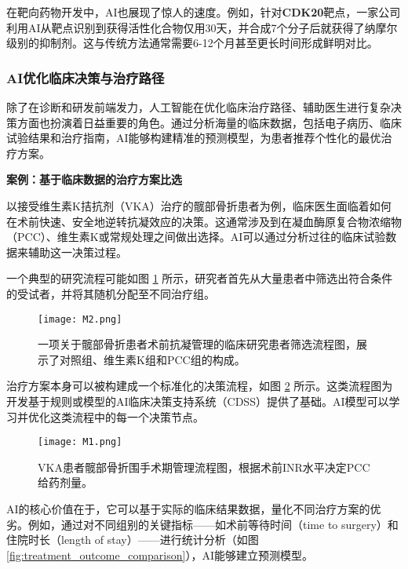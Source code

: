 \begin{itemize}
\begin{enumerate}
        在靶向药物开发中，AI也展现了惊人的速度。例如，针对\textbf{CDK20}靶点，一家公司利用AI从靶点识别到获得活性化合物仅用30天，并合成7个分子后就获得了纳摩尔级别的抑制剂。这与传统方法通常需要6-12个月甚至更长时间形成鲜明对比。
    \end{enumerate}

    \subsubsection{AI优化临床决策与治疗路径}
    除了在诊断和研发前端发力，人工智能在优化临床治疗路径、辅助医生进行复杂决策方面也扮演着日益重要的角色。通过分析海量的临床数据，包括电子病历、临床试验结果和治疗指南，AI能够构建精准的预测模型，为患者推荐个性化的最优治疗方案。

    \textbf{案例：基于临床数据的治疗方案比选}

    以接受维生素K拮抗剂（VKA）治疗的髋部骨折患者为例，临床医生面临着如何在术前快速、安全地逆转抗凝效应的决策。这通常涉及到在凝血酶原复合物浓缩物（PCC）、维生素K或常规处理之间做出选择。AI可以通过分析过往的临床试验数据来辅助这一决策过程。

    一个典型的研究流程可能如图 \ref{fig:clinical_trial_patient_selection} 所示，研究者首先从大量患者中筛选出符合条件的受试者，并将其随机分配至不同治疗组。

    \begin{figure}[htbp]
        \centering
        \texttt{[image: M2.png]}
        \caption{一项关于髋部骨折患者术前抗凝管理的临床研究患者筛选流程图，展示了对照组、维生素K组和PCC组的构成。}
        \label{fig:clinical_trial_patient_selection}
    \end{figure}

    治疗方案本身可以被构建成一个标准化的决策流程，如图 \ref{fig:hip_fracture_treatment_protocol} 所示。这类流程图为开发基于规则或模型的AI临床决策支持系统（CDSS）提供了基础。AI模型可以学习并优化这类流程中的每一个决策节点。

    \begin{figure}[htbp]
        \centering
        \texttt{[image: M1.png]}
        \caption{VKA患者髋部骨折围手术期管理流程图，根据术前INR水平决定PCC给药剂量。}
        \label{fig:hip_fracture_treatment_protocol}
    \end{figure}

    AI的核心价值在于，它可以基于实际的临床结果数据，量化不同治疗方案的优劣。例如，通过对不同组别的关键指标——如术前等待时间（time to surgery）和住院时长（length of stay）——进行统计分析（如图 \ref{fig:treatment_outcome_comparison}），AI能够建立预测模型。


\end{itemize}
